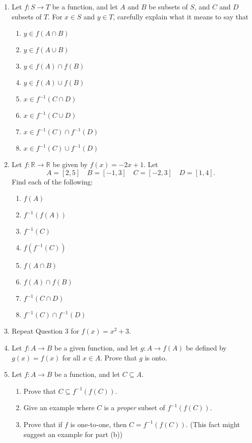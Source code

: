 \documentclass[letterpaper,12pt]{article}
\newcommand{\R}{\mathbb{R}}
\begin{document}
\begin{enumerate}
\item Let $f:S\to T$ be a function, and let $A$ and $B$ be subsets of $S$, and $C$ and $D$ subsets of $T$. For $x\in S$ and $y\in T$, carefully explain what it means to say that
\begin{multicols}{2}
 \begin{enumerate}
  \item $y\in f(A\cap B)$
  \item $y\in f(A\cup B)$
  \item $y\in f(A)\cap f(B)$
  \item $y\in f(A)\cup f(B)$
  \item $x\in f^{-1}(C\cap D)$
  \item $x\in f^{-1}(C\cup D)$
  \item $x\in f^{-1}(C)\cap f^{-1}(D)$
  \item $x\in f^{-1}(C)\cup f^{-1}(D)$
 \end{enumerate}
\end{multicols}
\item Let $f:\R\to\R$ be given by $f(x)=-2x+1$. Let
\[
 A = [2,5]\quad B = [-1,3]\quad C = [-2,3] \quad D =[1,4].
\]
Find each of the following:
\begin{multicols}{2}
 \begin{enumerate}
  \item $f(A)$
  \item $f^{-1}(f(A))$
  \item $f^{-1}(C)$
  \item $f(f^{-1}(C))$
  \item $f(A\cap B)$
  \item $f(A)\cap f(B)$
  \item $f^{-1}(C\cap D)$
  \item $f^{-1}(C)\cap f^{-1}(D)$
 \end{enumerate}
\end{multicols}
\item Repeat Question 3 for $f(x) = x^2+3$.
\item Let $f:A\to B$ be a given function, and let $g:A\to f(A)$ be defined by $g(x)=f(x)$ for all $x\in A$. Prove that $g$ is onto.
\newpage
\item Let $f:A\to B$ be a function, and let $C\subseteq A$.
\begin{enumerate}
 \item Prove that $C\subseteq f^{-1}(f(C))$.
 \item Give an example where $C$ is a {\em proper} subset of $f^{-1}(f(C))$.
 \item Prove that if $f$ is one-to-one, then $C=f^{-1}(f(C))$. (This fact might suggest an example for part (b))

\end{enumerate}
\end{enumerate}
\end{document}

